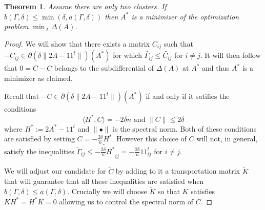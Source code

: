 \documentclass[12pt]{amsart}
\newtheorem{theorem}[lemma]{Theorem}
\numberwithin{equation}{section}
\begin{document}
\begin{theorem} Assume there are only two clusters. If $b(\Gamma,\delta)\leq \min(\delta, a(\Gamma,\delta))$ then $A^*$ is a minimizer of the optimization problem $\min_A\Delta(A)$. 
\end{theorem}
\begin{proof} We will show that there exists a matrix $C_{ij}$ such that $-C_{ij}\in \partial \left(\delta\|2A-11^t\|\right)(A^*)$ for which $\widetilde{\Gamma_{ij}}\leq \widetilde{C_{ij}}$ for $i\neq j$. It will then follow that $0=C-C$ belongs to the subdifferential of $\Delta(A)$ at $A^*$ and thus $A^*$ is a minimizer as claimed.

Recall that $-C\in \partial \left(\delta\|2A-11^t\|\right)(A^*)$ if and only if it satifies the conditions
\[ \langle H^* , C\rangle =-2\delta n\text{ and }\|C\|\leq 2\delta \]
where $H^*:=2A^*-11^t$ and $\|\bullet\|$ is the spectral norm. 
Both of these conditions are satisfied by setting $C=-\frac{2\delta}{n} H^*$. However this choice of $C$ will not, in general, satisfy the inequalities $\widetilde{\Gamma}_{ij}\leq \widetilde{-\frac{2\delta}{n} H^*}_{ij}=-\frac{2\delta}{n}11^t_{ij}$ for $i\neq j$. 

We will adjust our candidate for $\widetilde{C}$ by adding to it a transportation matrix $\widetilde{K}$ that will guarantee that all these inequalities are satisfied when $b(\Gamma,\delta)\leq a(\Gamma, \delta)$. Crucially we will choose $\widetilde{K}$ so that $K$ satisfies $KH^*=H^*K=0$ allowing us to control the spectral norm of $C$.


\end{proof}
\end{document}
